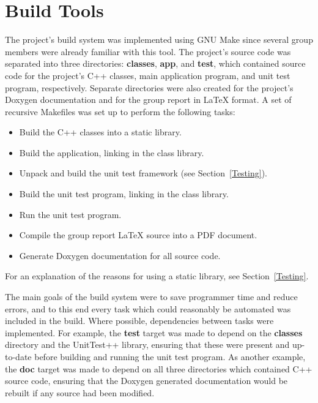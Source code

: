 \section{Build Tools}
\label{Build Tools}
The project's build system was implemented using GNU Make since several group members were already familiar with this tool.  The project's source code was separated into three directories: \textbf{classes}, \textbf{app}, and \textbf{test}, which contained source code for the project's C++ classes, main application program, and unit test program, respectively.  Separate directories were also created for the project's Doxygen documentation and for the group report in LaTeX format.  A set of recursive Makefiles was set up to perform the following tasks:

\begin{itemize}

  \item Build the C++ classes into a static library.
  \item Build the application, linking in the class library.
  \item Unpack and build the unit test framework (see Section~\ref{Testing}).
  \item Build the unit test program, linking in the class library.
  \item Run the unit test program.
  \item Compile the group report LaTeX source into a PDF document.
  \item Generate Doxygen documentation for all source code.

\end{itemize}

For an explanation of the reasons for using a static library, see Section~\ref{Testing}.  

The main goals of the build system were to save programmer time and reduce errors, and to this end every task which could reasonably be automated was included in the build.  Where possible, dependencies between tasks were implemented.  For example, the \textbf{test} target was made to depend on the \textbf{classes} directory and the UnitTest++ library, ensuring that these were present and up-to-date before building and running the unit test program.  As another example, the \textbf{doc} target was made to depend on all three directories which contained C++ source code, ensuring that the Doxygen generated documentation would be rebuilt if any source had been modified.

